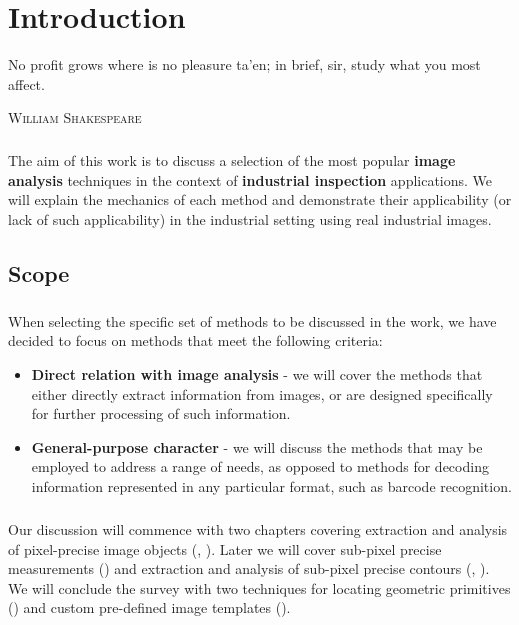 \chapter*{Introduction}

\epigraph{No profit grows where is no pleasure ta'en; in brief, sir, study what you most affect.}
{\textsc{William Shakespeare}}


\pagebreak


\paragraph*{}
The aim of this work is to discuss a selection of the most popular \textbf{image analysis} techniques in the context of \textbf{industrial inspection} applications. We will explain the mechanics of each method and demonstrate their applicability (or lack of such applicability) in the industrial setting using real industrial images.

\section*{Scope}

\paragraph*{}
When selecting the specific set of methods to be discussed in the work, we have decided to focus on methods that meet the following criteria:
\begin{itemize}
	\item \textbf{Direct relation with image analysis} - we will cover the methods that either directly extract information from images, or are designed specifically for further processing of such information.
	\item \textbf{General-purpose character} - we will discuss the methods that may be employed to address a range of needs, as opposed to methods for decoding information represented in any particular format, such as barcode recognition.
\end{itemize}

\paragraph*{}
Our discussion will commence with two chapters covering extraction and analysis of pixel-precise image objects (, ). Later we will cover sub-pixel precise measurements () and extraction and analysis of sub-pixel precise contours (, ). We will conclude the survey with two techniques for locating geometric primitives () and custom pre-defined image templates ().


